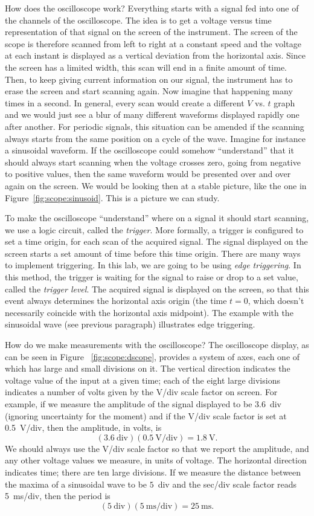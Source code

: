 How does the oscilloscope work? Everything starts with a signal fed
into one of the channels of the oscilloscope. The idea is to get a voltage
versus time representation of that signal on the screen of the instrument. The
screen of the scope is therefore scanned from left to right at a constant
speed and the voltage at each instant is displayed as a vertical deviation from
the horizontal axis. Since the screen has a limited width, this scan will end
in a finite amount of time. Then, to keep giving current information on our
signal, the instrument has to erase the screen and start scanning again. Now
imagine that happening many times in a second. In general, every scan would
create a different $V$ vs. $t$ graph and we would just see a blur of many
different waveforms displayed rapidly one after another. For periodic signals,
this situation can be amended if the scanning always starts from the same
position on a cycle of the wave. Imagine for instance a sinusoidal waveform.
If the oscilloscope could somehow ``understand'' that it should always start
scanning when the voltage crosses zero, going from negative to positive
values, then the same waveform would be presented over and over again on the
screen. We would be looking then at a stable picture, like the one in
Figure~\ref{fig:scope:sinusoid}. This is a picture we can study.

To make the oscilloscope ``understand'' where on a signal it should start
scanning, we use a logic circuit, called the {\it trigger}. More formally, a
trigger is configured to set a time origin, for each scan of the acquired
signal. The signal displayed on the screen starts a set amount of time before
this time origin. There are many ways to implement triggering. In this lab, we
are going to be using {\it edge triggering}. In this method, the trigger is
waiting for the signal to raise or drop to a set value, called the {\it trigger
level}. The acquired signal is displayed on the screen, so that this event always
determines the horizontal axis origin (the time $t=0$, which doesn't necessarily
coincide with the horizontal axis midpoint). The example with the sinusoidal wave
(see previous paragraph) illustrates edge triggering.

How do we make measurements with the oscilloscope? The oscilloscope display,
as can be seen in Figure ~\ref{fig:scope:dscope}, provides a system of axes,
each one of which has large and small divisions on it.
The vertical direction indicates the voltage value of the input at a given 
time; each of the eight large divisions indicates a number of volts given by the
V/div scale factor on screen.  For example, if we measure the amplitude of 
the signal displayed to be 3.6~div (ignoring uncertainty for the moment)
and if the V/div scale factor is set at 0.5~V/div, then the amplitude,
in volts, is 
$$ (3.6~\mbox{div}) (0.5~\mbox{V/div}) = 1.8~\mbox{V}. $$
We should always use the V/div scale factor so that we report the amplitude, and
any other voltage values we measure, in units of voltage. The horizontal direction
indicates time; there are ten large divisions. If we measure the distance between 
the maxima of a sinusoidal wave to be $5$~div and the sec/div scale factor
reads 5~ms/div, then the period is 
$$(5~\mbox{div}) (5~\mbox{ms/div}) = 25~\mbox{ms}.$$

